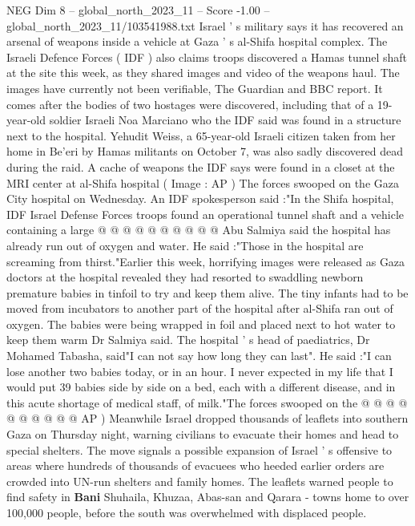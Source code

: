 \begin{textsample}{NEG Dim 8 – global\_north\_2023\_11 – Score -1.00 – global\_north\_2023\_11/103541988.txt}  \label{ex:f8_neg_336}
Israel ' s military says it has recovered an arsenal of weapons inside a vehicle at Gaza ' s al-Shifa hospital complex.
The Israeli Defence Forces ( IDF ) also claims troops discovered a Hamas tunnel shaft at the site this week, as they shared images and video of the weapons haul.
The images have currently not been verifiable, The Guardian and BBC report.
It comes after the bodies of two hostages were discovered, including that of a 19-year-old soldier Israeli Noa Marciano who the IDF said was found in a structure next to the hospital.
Yehudit Weiss, a 65-year-old Israeli citizen taken from her home in Be'eri by Hamas militants on October 7, was also sadly discovered dead during the raid.
A cache of weapons the IDF says were found in a closet at the MRI center at al-Shifa hospital ( Image : AP ) The forces swooped on the Gaza City hospital on Wednesday.
An IDF spokesperson said :"In the Shifa hospital, IDF Israel Defense Forces troops found an operational tunnel shaft and a vehicle containing a large @ @ @ @ @ @ @ @ @ @ Abu Salmiya said the hospital has already run out of oxygen and water.
He said :"Those in the hospital are screaming from thirst."Earlier this week, horrifying images were released as Gaza doctors at the hospital revealed they had resorted to swaddling newborn premature babies in tinfoil to try and keep them alive.
The tiny infants had to be moved from incubators to another part of the hospital after al-Shifa ran out of oxygen.
The babies were being wrapped in foil and placed next to hot water to keep them warm Dr Salmiya said.
The hospital ' s head of paediatrics, Dr Mohamed Tabasha, said"I can not say how long they can last".
He said :"I can lose another two babies today, or in an hour.
I never expected in my life that I would put 39 babies side by side on a bed, each with a different disease, and in this acute shortage of medical staff, of milk."The forces swooped on the @ @ @ @ @ @ @ @ @ @ AP ) Meanwhile Israel dropped thousands of leaflets into southern Gaza on Thursday night, warning civilians to evacuate their homes and head to special shelters.
The move signals a possible expansion of Israel ' s offensive to areas where hundreds of thousands of evacuees who heeded earlier orders are crowded into UN-run shelters and family homes.
The leaflets warned people to find safety in \textbf{Bani} Shuhaila, Khuzaa, Abas-san and Qarara - towns home to over 100,000 people, before the south was overwhelmed with displaced people.

\end{textsample}
